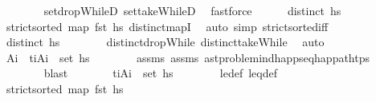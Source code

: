 \begin{isabellebody}
\ \ \ \ \ \ \isamarkupfalse%
\ set{\isacharunderscore}{\kern0pt}dropWhileD\ set{\isacharunderscore}{\kern0pt}takeWhileD\ \isamarkupfalse%
\ fastforce\isanewline
\ \ \ \ \isamarkupfalse%
\ {\isachardoublequoteopen}distinct\ hs{\isachardoublequoteclose}\isanewline
\ \ \ \ \ \ \isamarkupfalse%
\ {\isacartoucheopen}strict{\isacharunderscore}{\kern0pt}sorted\ {\isacharparenleft}{\kern0pt}map\ fst\ hs{\isacharparenright}{\kern0pt}{\isacartoucheclose}\ distinct{\isacharunderscore}{\kern0pt}mapI\ \isamarkupfalse%
\ {\isacharparenleft}{\kern0pt}auto\ simp{\isacharcolon}{\kern0pt}\ strict{\isacharunderscore}{\kern0pt}sorted{\isacharunderscore}{\kern0pt}iff{\isacharparenright}{\kern0pt}\isanewline
\ \ \ \ \isamarkupfalse%
\ \isamarkupfalse%
\ {\isachardoublequoteopen}distinct\ {\isacharquery}{\kern0pt}hs{\isacharprime}{\kern0pt}{\isachardoublequoteclose}\isanewline
\ \ \ \ \ \ \isamarkupfalse%
\ distinct{\isacharunderscore}{\kern0pt}dropWhile\ distinct{\isacharunderscore}{\kern0pt}takeWhile\ \isamarkupfalse%
\ auto\isanewline
\ \ \ \ \isamarkupfalse%
\ A\isactrlsub i\ \ {\isachardoublequoteopen}{\isacharparenleft}{\kern0pt}t\isactrlsub i{\isacharcomma}{\kern0pt}A\isactrlsub i{\isacharparenright}{\kern0pt}\ {\isasymin}\ set\ hs{\isachardoublequoteclose}\isanewline
\ \ \ \ \ \ \isamarkupfalse%
\ assms{\isacharparenleft}{\kern0pt}{}{\isacharparenright}{\kern0pt}\ assms{\isacharparenleft}{\kern0pt}{}{\isacharparenright}{\kern0pt}\ ast{\isacharunderscore}{\kern0pt}problem{\isachardot}{\kern0pt}ind{\isacharunderscore}{\kern0pt}happ{\isacharunderscore}{\kern0pt}seq{\isacharunderscore}{\kern0pt}happ{\isacharunderscore}{\kern0pt}at{\isacharunderscore}{\kern0pt}htps\isanewline
\ \ \ \ \ \ \isamarkupfalse%
\ blast\isanewline
\ \ \ \ \isamarkupfalse%
\ \isamarkupfalse%
\ {\isachardoublequoteopen}{\isacharparenleft}{\kern0pt}t\isactrlsub i{\isacharcomma}{\kern0pt}A\isactrlsub i{\isacharparenright}{\kern0pt}\ {\isasymin}\ set\ {\isacharquery}{\kern0pt}hs{\isacharprime}{\kern0pt}{\isachardoublequoteclose}\isanewline
\ \ \ \ \ \ \isamarkupfalse%
\ le{\isacharunderscore}{\kern0pt}def\ leq{\isacharunderscore}{\kern0pt}def\isanewline
\ \ \ \ \ \ \isamarkupfalse%
\ {\isacartoucheopen}strict{\isacharunderscore}{\kern0pt}sorted\ {\isacharparenleft}{\kern0pt}map\ fst\ hs{\isacharparenright}{\kern0pt}{\isacartoucheclose}\ \isamarkupfalse%

\end{isabellebody}

